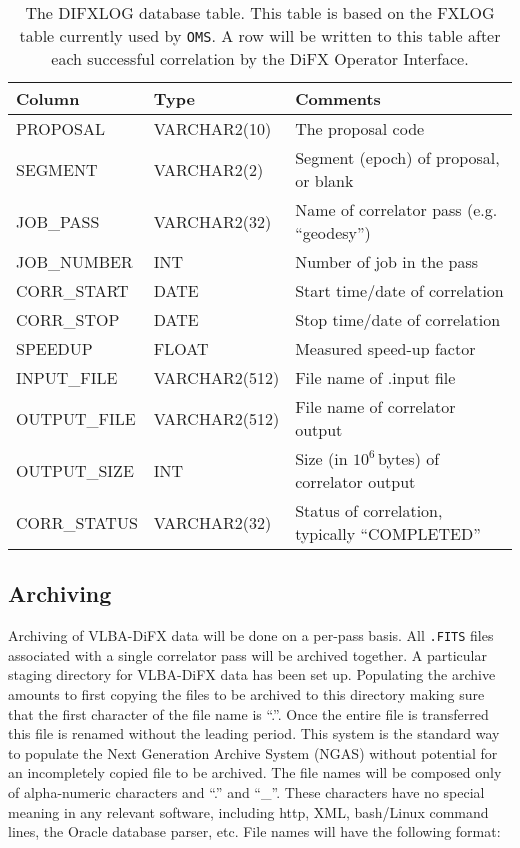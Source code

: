\begin{table}[h]
\vspace{2mm}
\begin{center}
\renewcommand{\tabcolsep}{1.4mm}
\begin{tabular}{lll}
\hline
\hline
   \multicolumn{1}{l}{Column}
 & \multicolumn{1}{l}{Type}
 & \multicolumn{1}{l}{Comments}
\\
\hline
PROPOSAL	& VARCHAR2(10)	& The proposal code \\
SEGMENT		& VARCHAR2(2)	& Segment (epoch) of proposal, or blank \\
JOB\_PASS	& VARCHAR2(32)	& Name of correlator pass (e.g. ``geodesy'') \\
JOB\_NUMBER	& INT		& Number of job in the pass \\
CORR\_START	& DATE		& Start time/date of correlation \\
CORR\_STOP	& DATE		& Stop time/date of correlation \\
SPEEDUP         & FLOAT         & Measured speed-up factor \\
INPUT\_FILE     & VARCHAR2(512) & File name of .input file \\
OUTPUT\_FILE	& VARCHAR2(512)	& File name of correlator output \\
OUTPUT\_SIZE	& INT		& Size (in $10^6$\,bytes) of correlator output \\
CORR\_STATUS	& VARCHAR2(32)	& Status of correlation, typically ``COMPLETED'' \\
\hline
\end{tabular}
\end{center}
\caption{
The DIFXLOG database table.  This table is based on the FXLOG table currently used by {\tt OMS}.
A row will be written to this table after each successful correlation by the DiFX Operator Interface.
\label{tab:difxlog}}
\end{table}

\subsection{Archiving} \label{sec:archive}

Archiving of VLBA-DiFX data will be done on a per-pass basis.
All {\tt .FITS} files associated with a single correlator pass will be archived together.
A particular staging directory for VLBA-DiFX data has been set up.
Populating the archive amounts to first copying the files to be archived to this directory making sure that the first character of the file name is ``.''.
Once the entire file is transferred this file is renamed without the leading period.
This system is the standard way to populate the Next Generation Archive System (NGAS) \cite{ngas} without potential for an incompletely copied file to be archived.
The file names will be composed only of alpha-numeric characters and ``.'' and ``\_''.
These characters have no special meaning in any relevant software, including http, XML, bash/Linux command lines, the Oracle database parser, etc.  File names will have the following format:

